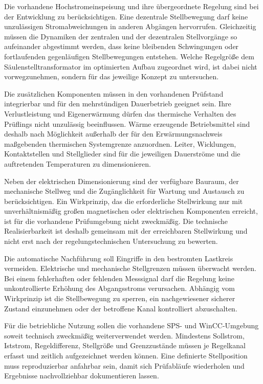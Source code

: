 Die vorhandene Hochstromeinspeisung und ihre übergeordnete Regelung sind bei
der Entwicklung zu berücksichtigen. Eine dezentrale Stellbewegung darf keine
unzulässigen Stromabweichungen in anderen Abgängen hervorrufen. Gleichzeitig
müssen die Dynamiken der zentralen und der dezentralen Stellvorgänge so
aufeinander abgestimmt werden, dass keine bleibenden Schwingungen oder
fortlaufenden gegenläufigen Stellbewegungen entstehen. Welche Regelgröße dem
Säulenstelltransformator im optimierten Aufbau zugeordnet wird, ist dabei
nicht vorwegzunehmen, sondern für das jeweilige Konzept zu untersuchen.

Die zusätzlichen Komponenten müssen in den vorhandenen Prüfstand integrierbar
und für den mehrstündigen Dauerbetrieb geeignet sein. Ihre Verlustleistung
und Eigenerwärmung dürfen das thermische Verhalten des Prüflings nicht
unzulässig beeinflussen. Wärme erzeugende Betriebsmittel sind deshalb nach
Möglichkeit außerhalb der für den Erwärmungsnachweis maßgebenden thermischen
Systemgrenze anzuordnen. Leiter, Wicklungen, Kontaktstellen und Stellglieder
sind für die jeweiligen Dauerströme und die auftretenden Temperaturen zu
dimensionieren.

Neben der elektrischen Dimensionierung sind der verfügbare Bauraum, der
mechanische Stellweg und die Zugänglichkeit für Wartung und Austausch zu
berücksichtigen. Ein Wirkprinzip, das die erforderliche Stellwirkung nur mit
unverhältnismäßig großen magnetischen oder elektrischen Komponenten
erreicht, ist für die vorhandene Prüfumgebung nicht zweckmäßig. Die
technische Realisierbarkeit ist deshalb gemeinsam mit der erreichbaren
Stellwirkung und nicht erst nach der regelungstechnischen Untersuchung zu
bewerten.

Die automatische Nachführung soll Eingriffe in den bestromten Lastkreis
vermeiden. Elektrische und mechanische Stellgrenzen müssen überwacht werden.
Bei einem fehlerhaften oder fehlenden Messsignal darf die Regelung keine
unkontrollierte Erhöhung des Abgangsstroms verursachen. Abhängig vom
Wirkprinzip ist die Stellbewegung zu sperren, ein nachgewiesener sicherer
Zustand einzunehmen oder der betroffene Kanal kontrolliert abzuschalten.

Für die betriebliche Nutzung sollen die vorhandene SPS- und WinCC-Umgebung
soweit technisch zweckmäßig weiterverwendet werden. Mindestens Sollstrom,
Iststrom, Regeldifferenz, Stellgröße und Grenzzustände müssen je Regelkanal
erfasst und zeitlich aufgezeichnet werden können. Eine definierte
Stellposition muss reproduzierbar anfahrbar sein, damit sich Prüfabläufe
wiederholen und Ergebnisse nachvollziehbar dokumentieren lassen.

